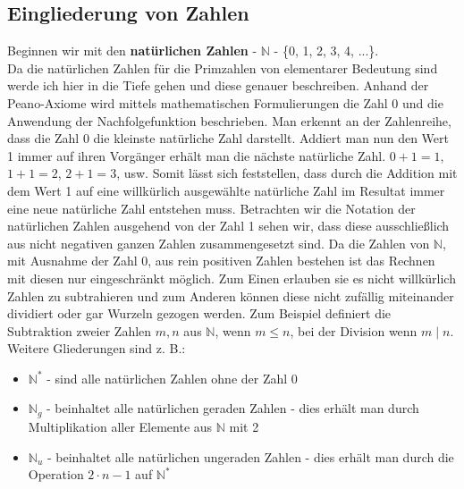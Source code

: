 \documentclass[12pt,a4paper]{article}
\theoremstyle{definition}
\begin{document}
\subsection{Eingliederung von Zahlen}\label{Eingliederung von Zahlen}
Beginnen wir mit den \textbf{natürlichen Zahlen} - $\mathbb{N}$ - \{0, 1, 2, 3, 4, ...\}.\\
Da die natürlichen Zahlen für die Primzahlen von elementarer Bedeutung sind werde ich hier in die Tiefe gehen und diese genauer beschreiben.
Anhand der Peano-Axiome wird mittels mathematischen Formulierungen die Zahl 0 und die Anwendung der Nachfolgefunktion beschrieben.\newline 
Man erkennt an der Zahlenreihe, dass die Zahl 0 die kleinste natürliche Zahl darstellt.
Addiert man nun den Wert 1 immer auf ihren Vorgänger erhält man die nächste natürliche Zahl.
$0 + 1 = 1$, $1 + 1 = 2$, $2 + 1 = 3$, usw.
Somit lässt sich feststellen, dass durch die Addition mit dem Wert 1 auf eine willkürlich ausgewählte natürliche Zahl im Resultat immer eine neue natürliche Zahl entstehen muss.
Betrachten wir die Notation der natürlichen Zahlen ausgehend von der Zahl 1 sehen wir, dass diese ausschließlich aus nicht negativen ganzen Zahlen zusammengesetzt sind.\newline
Da die Zahlen von $\mathbb{N}$, mit Ausnahme der Zahl 0, aus rein positiven Zahlen bestehen ist das Rechnen mit diesen nur eingeschränkt möglich.
Zum Einen erlauben sie es nicht willkürlich Zahlen zu subtrahieren und zum Anderen können diese nicht zufällig miteinander dividiert oder gar Wurzeln gezogen werden.
Zum Beispiel definiert die Subtraktion zweier Zahlen $m, n$ aus $\mathbb{N}$, wenn $m \le n$, bei der Division wenn $m \mid n$.\newline
Weitere Gliederungen sind z. B.:
\begin{itemize}
\item $\mathbb{N}^*$ - sind alle natürlichen Zahlen ohne der Zahl 0
\item $\mathbb{N}_g$ - beinhaltet alle natürlichen geraden Zahlen - dies erhält man durch Multiplikation aller Elemente aus $\mathbb{N}$ mit 2
\item $\mathbb{N}_u$ - beinhaltet alle natürlichen ungeraden Zahlen - dies erhält man durch die Operation $2 \cdot n - 1$ auf $\mathbb{N}^*$
\end{itemize}
\end{document}
